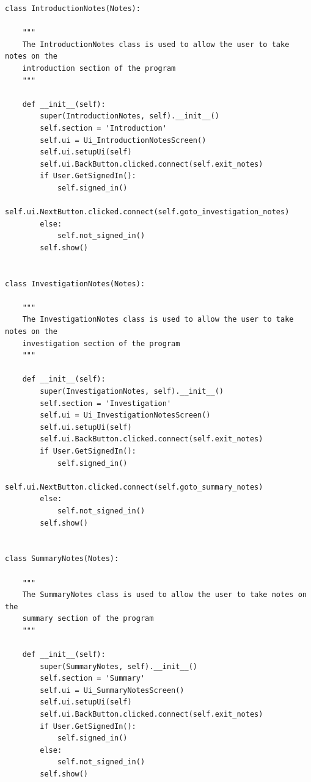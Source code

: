 \documentclass[12pt]{article}
\begin{document}
\begin{lstlisting}
class IntroductionNotes(Notes):

    """
    The IntroductionNotes class is used to allow the user to take notes on the
    introduction section of the program
    """

    def __init__(self):
        super(IntroductionNotes, self).__init__()
        self.section = 'Introduction'
        self.ui = Ui_IntroductionNotesScreen()
        self.ui.setupUi(self)
        self.ui.BackButton.clicked.connect(self.exit_notes)
        if User.GetSignedIn():
            self.signed_in()
            self.ui.NextButton.clicked.connect(self.goto_investigation_notes)
        else:
            self.not_signed_in()
        self.show()


class InvestigationNotes(Notes):

    """
    The InvestigationNotes class is used to allow the user to take notes on the
    investigation section of the program
    """

    def __init__(self):
        super(InvestigationNotes, self).__init__()
        self.section = 'Investigation'
        self.ui = Ui_InvestigationNotesScreen()
        self.ui.setupUi(self)
        self.ui.BackButton.clicked.connect(self.exit_notes)
        if User.GetSignedIn():
            self.signed_in()
            self.ui.NextButton.clicked.connect(self.goto_summary_notes)
        else:
            self.not_signed_in()
        self.show()


class SummaryNotes(Notes):

    """
    The SummaryNotes class is used to allow the user to take notes on the
    summary section of the program
    """

    def __init__(self):
        super(SummaryNotes, self).__init__()
        self.section = 'Summary'
        self.ui = Ui_SummaryNotesScreen()
        self.ui.setupUi(self)
        self.ui.BackButton.clicked.connect(self.exit_notes)
        if User.GetSignedIn():
            self.signed_in()
        else:
            self.not_signed_in()
        self.show()
\end{lstlisting}
\end{document}
